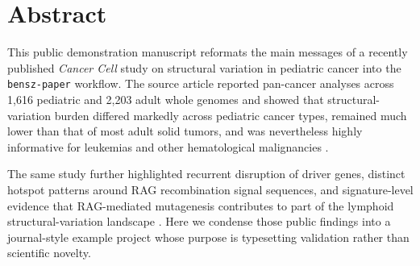 \section{Abstract}
This public demonstration manuscript reformats the main messages of a
recently published \emph{Cancer Cell} study on structural variation in
pediatric cancer into the \texttt{bensz-paper} workflow. The source
article reported pan-cancer analyses across 1,616 pediatric and 2,203
adult whole genomes and showed that structural-variation burden differed
markedly across pediatric cancer types, remained much lower than that of
most adult solid tumors, and was nevertheless highly informative for
leukemias and other hematological malignancies \supercite{Greenhalgh_2026}.

The same study further highlighted recurrent disruption of driver genes,
distinct hotspot patterns around RAG recombination signal sequences, and
signature-level evidence that RAG-mediated mutagenesis contributes to
part of the lymphoid structural-variation landscape \supercite{Greenhalgh_2026}. Here
we condense those public findings into a journal-style example project
whose purpose is typesetting validation rather than scientific novelty.
